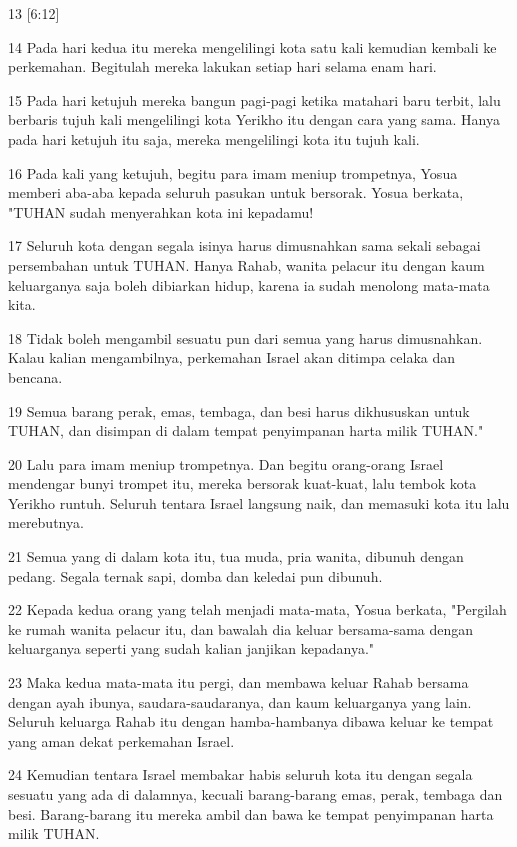 \par 13 [6:12]
\par 14 Pada hari kedua itu mereka mengelilingi kota satu kali kemudian kembali ke perkemahan. Begitulah mereka lakukan setiap hari selama enam hari.
\par 15 Pada hari ketujuh mereka bangun pagi-pagi ketika matahari baru terbit, lalu berbaris tujuh kali mengelilingi kota Yerikho itu dengan cara yang sama. Hanya pada hari ketujuh itu saja, mereka mengelilingi kota itu tujuh kali.
\par 16 Pada kali yang ketujuh, begitu para imam meniup trompetnya, Yosua memberi aba-aba kepada seluruh pasukan untuk bersorak. Yosua berkata, "TUHAN sudah menyerahkan kota ini kepadamu!
\par 17 Seluruh kota dengan segala isinya harus dimusnahkan sama sekali sebagai persembahan untuk TUHAN. Hanya Rahab, wanita pelacur itu dengan kaum keluarganya saja boleh dibiarkan hidup, karena ia sudah menolong mata-mata kita.
\par 18 Tidak boleh mengambil sesuatu pun dari semua yang harus dimusnahkan. Kalau kalian mengambilnya, perkemahan Israel akan ditimpa celaka dan bencana.
\par 19 Semua barang perak, emas, tembaga, dan besi harus dikhususkan untuk TUHAN, dan disimpan di dalam tempat penyimpanan harta milik TUHAN."
\par 20 Lalu para imam meniup trompetnya. Dan begitu orang-orang Israel mendengar bunyi trompet itu, mereka bersorak kuat-kuat, lalu tembok kota Yerikho runtuh. Seluruh tentara Israel langsung naik, dan memasuki kota itu lalu merebutnya.
\par 21 Semua yang di dalam kota itu, tua muda, pria wanita, dibunuh dengan pedang. Segala ternak sapi, domba dan keledai pun dibunuh.
\par 22 Kepada kedua orang yang telah menjadi mata-mata, Yosua berkata, "Pergilah ke rumah wanita pelacur itu, dan bawalah dia keluar bersama-sama dengan keluarganya seperti yang sudah kalian janjikan kepadanya."
\par 23 Maka kedua mata-mata itu pergi, dan membawa keluar Rahab bersama dengan ayah ibunya, saudara-saudaranya, dan kaum keluarganya yang lain. Seluruh keluarga Rahab itu dengan hamba-hambanya dibawa keluar ke tempat yang aman dekat perkemahan Israel.
\par 24 Kemudian tentara Israel membakar habis seluruh kota itu dengan segala sesuatu yang ada di dalamnya, kecuali barang-barang emas, perak, tembaga dan besi. Barang-barang itu mereka ambil dan bawa ke tempat penyimpanan harta milik TUHAN.
